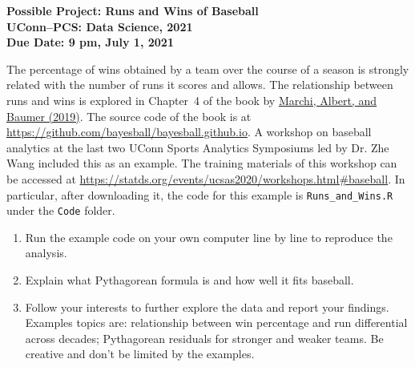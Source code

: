 \documentclass[12pt]{article}
\begin{document}
\begin{center}
  \bf Possible Project: Runs and Wins of Baseball\\
  UConn--PCS: Data Science, 2021\\
  Due Date: 9 pm, July 1, 2021
\end{center}

The percentage of wins obtained by a team over the course of a season
is strongly related with the number of runs it scores and allows. The
relationship between runs and wins is explored in Chapter~4 of the
book by
\href{https://www.amazon.com/gp/product/B07KRNP2BB/ref=dbs_a_def_rwt_bibl_vppi_i0}{Marchi,
  Albert, and Baumer (2019)}.
The source code of the book is at
\url{https://github.com/bayesball/bayesball.github.io}.
A workshop on baseball analytics at the last two UConn Sports
Analytics Symposiums led by Dr. Zhe Wang included this as an
example. The training materials of this workshop can be accessed at
\url{https://statds.org/events/ucsas2020/workshops.html#baseball}.
In particular, after downloading it, the code for this example is
\texttt{Runs\_and\_Wins.R} under the \texttt{Code} folder.

\begin{enumerate}
\item
Run the example code on your own computer line by line to reproduce
the analysis.

\item
Explain what Pythagorean formula is and how well it fits baseball.

\item
Follow your interests to further explore the data and report your
findings. Examples topics are: relationship between win percentage and
run differential across decades; Pythagorean residuals for stronger
and weaker teams. Be creative and don't be limited by the
examples.

\end{enumerate}
\end{document}
